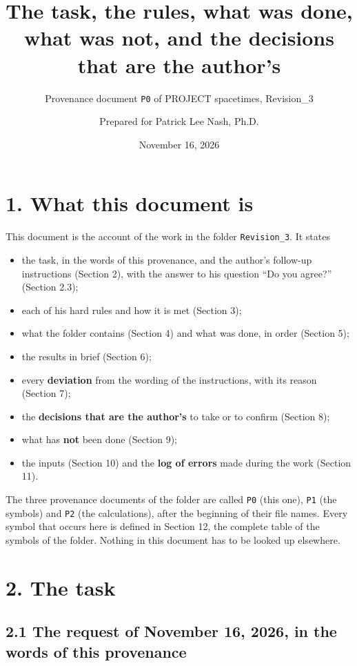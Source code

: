 \documentclass[
  10pt,
]{article}
\title{The task, the rules, what was done, what was not, and the
decisions that are the author's}
\subtitle{Provenance document \texttt{P0} of PROJECT spacetimes,
Revision\_3}
\author{Prepared for Patrick Lee Nash, Ph.D.}
\date{November 16, 2026}
\providecommand{\tightlist}{%
  \setlength{\itemsep}{0pt}\setlength{\parskip}{0pt}}
\begin{document}
\maketitle

\hypertarget{what-this-document-is}{%
\section{1. What this document is}\label{what-this-document-is}}

This document is the account of the work in the folder
\texttt{Revision\_3}. It states

\begin{itemize}
\tightlist
\item
  the task, in the words of this provenance, and the author's follow-up
  instructions (Section 2), with the answer to his question ``Do you
  agree?'' (Section 2.3);
\item
  each of his hard rules and how it is met (Section 3);
\item
  what the folder contains (Section 4) and what was done, in order
  (Section 5);
\item
  the results in brief (Section 6);
\item
  every \textbf{deviation} from the wording of the instructions, with
  its reason (Section 7);
\item
  the \textbf{decisions that are the author's} to take or to confirm
  (Section 8);
\item
  what has \textbf{not} been done (Section 9);
\item
  the inputs (Section 10) and the \textbf{log of errors} made during the
  work (Section 11).
\end{itemize}

The three provenance documents of the folder are called \texttt{P0}
(this one), \texttt{P1} (the symbols) and \texttt{P2} (the
calculations), after the beginning of their file names. Every symbol
that occurs here is defined in Section 12, the complete table of the
symbols of the folder. Nothing in this document has to be looked up
elsewhere.

\hypertarget{the-task}{%
\section{2. The task}\label{the-task}}

\hypertarget{the-request-of-november-16-2026-in-the-words-of-this-provenance}{%
\subsection{2.1 The request of November 16, 2026, in the words of this
provenance}\label{the-request-of-november-16-2026-in-the-words-of-this-provenance}}
\end{document}
